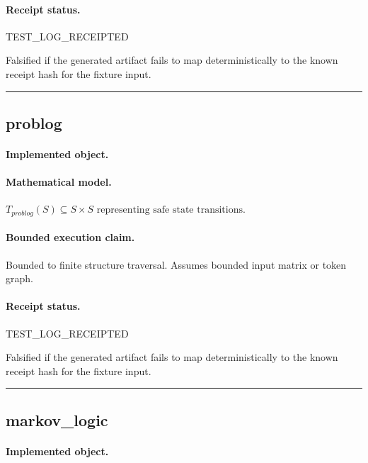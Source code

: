 \paragraph{Receipt status.} TEST\_LOG\_RECEIPTED
\begin{falsifier}
Falsified if the generated artifact fails to map deterministically to the known receipt hash for the fixture input.
\end{falsifier}

\vspace{1em}\hrule\vspace{1em}
\subsection{problog}
\paragraph{Implemented object.} 
\paragraph{Mathematical model.} $T_{problog}(S) \subseteq S \times S \text{ representing safe state transitions}.$
\paragraph{Bounded execution claim.} Bounded to finite structure traversal. Assumes bounded input matrix or token graph.
\paragraph{Receipt status.} TEST\_LOG\_RECEIPTED
\begin{falsifier}
Falsified if the generated artifact fails to map deterministically to the known receipt hash for the fixture input.
\end{falsifier}

\vspace{1em}\hrule\vspace{1em}
\subsection{markov\_logic}
\paragraph{Implemented object.} 
